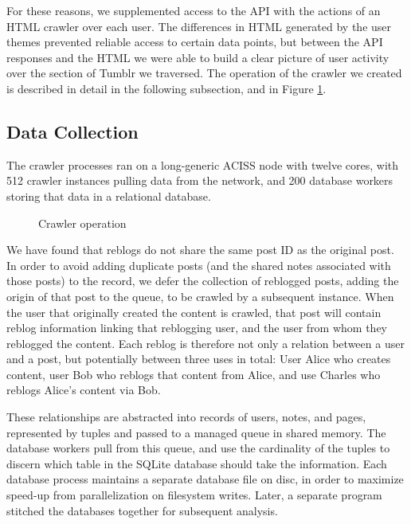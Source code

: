 For these reasons, we supplemented access to the API with the actions 
of an HTML crawler over each user.  The differences in HTML generated 
by the user themes prevented reliable access to certain data points, 
but between the API responses and the HTML we were able to build a 
clear picture of user activity over the section of Tumblr we 
traversed.  The operation of the crawler we created is described 
in detail in the following subsection, and in Figure \ref{crawler}.

\subsection{Data Collection}

The crawler processes ran on a long-generic ACISS node with twelve 
cores, with 512 crawler instances pulling data from the network, 
and 200 database workers storing that data in a relational database.

\begin{figure}
  
  \caption{Crawler operation}\label{crawler}
\end{figure}

We have found that reblogs do not share the same post ID as the original 
post.  In order to avoid adding duplicate posts (and the shared notes 
associated with those posts) to the record, we defer the collection of 
reblogged posts, adding the origin of that post to the queue, to be 
crawled by a subsequent instance.  When the user that originally 
created the content is crawled, that post will contain reblog 
information linking that reblogging user, and the user from whom they 
reblogged the content.  Each reblog is therefore not only a 
relation between a user and a post, but potentially between three 
uses in total: User Alice who creates content, user Bob who reblogs 
that content from Alice, and use Charles who reblogs Alice's content 
via Bob.


These relationships are abstracted into records of users, notes, and pages, 
represented by tuples and passed to a managed queue in 
shared memory.  The database workers pull from this queue, and use 
the cardinality of the tuples to discern which table in the SQLite 
database should take the information.  Each database process 
maintains a separate database file on disc, in order to maximize 
speed-up from parallelization on filesystem writes.  Later, a 
separate program stitched the databases together for subsequent 
analysis.

